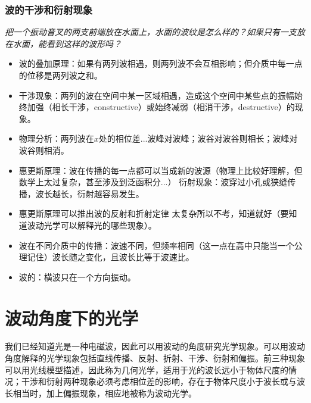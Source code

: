 \documentclass[a4paper,9pt]{ctexart}
\begin{document}
\subsubsection{波的干涉和衍射现象}
\emph{把一个振动音叉的两支前端放在水面上，水面的波纹是怎么样的？如果只有一支放在水面，能看到这样的波形吗？}
\begin{itemize}
\item
波的叠加原理：如果有两列波相遇，则两列波不会互相影响；但介质中每一点的位移是两列波之和。
\item
干涉现象：两列的波在空间中某一区域相遇，造成这个空间中某些点的振幅始终加强（相长干涉，constructive）或始终减弱（相消干涉，destructive）的现象。
\item
物理分析：两列波在$x$处的相位差...\so 波峰对波峰；波谷对波谷则相长；波峰对波谷则相消。
\item
惠更斯原理：波在传播的每一点都可以当成新的波源（物理上比较好理解，但数学上太过复杂，甚至涉及到泛函积分...） \so 衍射现象：波穿过小孔或狭缝传播，波长越长，衍射越容易发生。
\item
惠更斯原理可以推出波的反射和折射定律 \so 太复杂所以不考，知道就好（要知道波动光学可以解释光的哪些现象）。
\item
波在不同介质中的传播：波速不同，但频率相同（这一点在高中只能当一个公理记住）\so 波长随之变化，且波长比等于波速比。
\item
波的：横波只在一个方向振动。
\end{itemize}



\newpage
\section{波动角度下的光学}
我们已经知道光是一种电磁波，因此可以用波动的角度研究光学现象。可以用波动角度解释的光学现象包括直线传播、反射、折射、干涉、衍射和偏振。前三种现象可以用光线模型描述，因此称为几何光学，适用于光的波长远小于物体尺度的情况；干涉和衍射两种现象必须考虑相位差的影响，存在于物体尺度小于波长或与波长相当时，加上偏振现象，相应地被称为波动光学。
\end{document}
